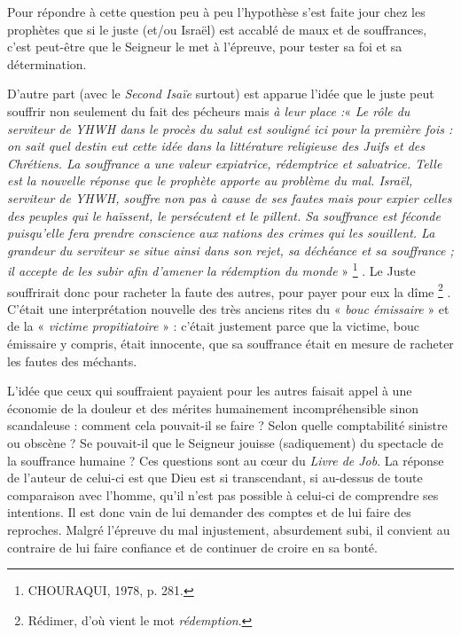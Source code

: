 Pour répondre à cette question peu à peu l'hypothèse s'est faite jour chez les prophètes que si le juste (et/ou Israël) est accablé de maux et de souffrances, c'est peut-être que le Seigneur le met à l'épreuve, pour tester sa foi et sa détermination. 

 D'autre part (avec le \emph{Second Isaïe} surtout) est apparue l'idée que le juste peut souffrir non seulement du fait des pécheurs mais \emph{à leur place :}« \emph{Le rôle du serviteur de YHWH dans le procès du salut est souligné ici pour la première fois : on sait quel destin eut cette idée dans la littérature religieuse des Juifs et des Chrétiens. La souffrance a une valeur expiatrice, rédemptrice et salvatrice. Telle est la nouvelle réponse que le prophète apporte au problème du mal. Israël, serviteur de YHWH, souffre non pas à cause de ses fautes mais pour expier celles des peuples qui le haïssent, le persécutent et le pillent. Sa souffrance est féconde puisqu'elle fera prendre conscience aux nations des crimes qui les souillent. La grandeur du serviteur se situe ainsi dans son rejet, sa déchéance et sa souffrance ; il accepte de les subir afin d'amener la rédemption du monde} »%
\footnote{CHOURAQUI, 1978, p. 281.}%
. Le Juste souffrirait donc pour racheter la faute des autres, pour payer pour eux la dîme%
\footnote{Rédimer, d'où vient le mot \emph{rédemption}.}%
. C'était une interprétation nouvelle des très anciens rites du « \emph{bouc émissaire} » et de la « \emph{victime propitiatoire} » : c'était justement parce que la victime, bouc émissaire y compris, était innocente, que sa souffrance était en mesure de racheter les fautes des méchants. 

 L'idée que ceux qui souffraient payaient pour les autres faisait appel à une économie de la douleur et des mérites humainement incompréhensible sinon scandaleuse : comment cela pouvait-il se faire ? Selon quelle comptabilité sinistre ou obscène ? Se pouvait-il que le Seigneur jouisse (sadiquement) du spectacle de la souffrance humaine ? Ces questions sont au cœur du \emph{Livre de Job}. La réponse de l'auteur de celui-ci est que Dieu est si transcendant, si au-dessus de toute comparaison avec l'homme, qu'il n'est pas possible à celui-ci de comprendre ses intentions. Il est donc vain de lui demander des comptes et de lui faire des reproches. Malgré l'épreuve du mal injustement, absurdement subi, il convient au contraire de lui faire confiance et de continuer de croire en sa bonté. 

